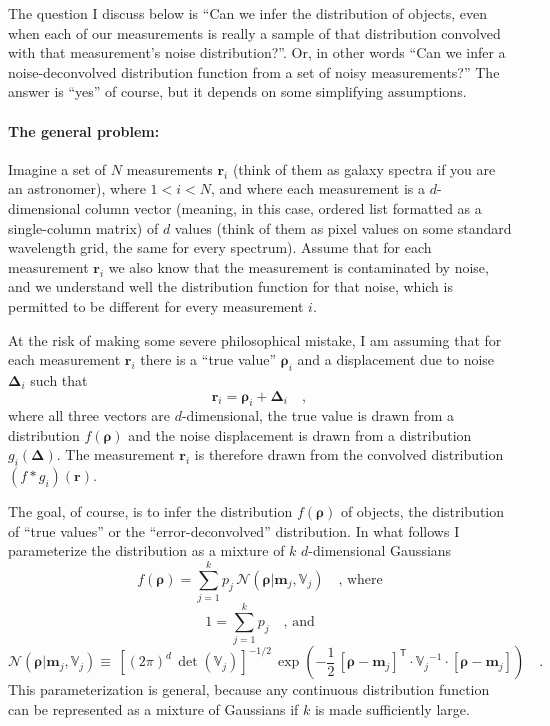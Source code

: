 \documentclass[12pt]{article}
\newcommand{\Mvector}[1]{\boldsymbol{#1}}
\newcommand{\measurement}{\Mvector{r}}
\newcommand{\truepoint}{\Mvector{\rho}}
\newcommand{\noise}{\Mvector{\Delta}}
\newcommand{\measurementi}{\measurement_i}
\newcommand{\truepointi}{\truepoint_i}
\newcommand{\noisei}{\noise_i}
\newcommand{\mean}{\Mvector{m}}
\newcommand{\meanj}{\mean_j}
\newcommand{\truedist}{f}
\newcommand{\noisedisti}{g_i}
\newcommand{\gaussian}{\mathcal{N}\!}
\newcommand{\ampj}{p_j}
\newcommand{\Mmatrix}[1]{\mathbb{#1}}
\newcommand{\varj}{\Mmatrix{V}_j}
\newcommand{\inverse}[1]{{#1}^{-1}}
\newcommand{\invvarj}{\inverse{\varj}}
\newcommand{\transpose}[1]{{#1}^{\mathsf{T}}}
\begin{document}
The question I discuss below is ``Can we infer the distribution of
objects, even when each of our measurements is really a sample of that
distribution convolved with that measurement's noise distribution?''.
Or, in other words ``Can we infer a noise-deconvolved distribution
function from a set of noisy measurements?''  The answer is ``yes'' of
course, but it depends on some simplifying assumptions.

\paragraph{The general problem:}
Imagine a set of $N$ measurements $\measurementi$ (think of them as
galaxy spectra if you are an astronomer), where $1<i<N$, and where
each measurement is a $d$-dimensional column vector (meaning, in this
case, ordered list formatted as a single-column matrix) of $d$ values
(think of them as pixel values on some standard wavelength grid, the
same for every spectrum).  Assume that for each measurement
$\measurementi$ we also know that the measurement is contaminated by
noise, and we understand well the distribution function for that
noise, which is permitted to be different for every measurement $i$.

At the risk of making some severe philosophical mistake, I am assuming
that for each measurement $\measurementi$ there is a ``true value''
$\truepointi$ and a displacement due to noise $\noisei$ such that
\begin{equation}
\measurementi=\truepointi+\noisei
\quad ,
\end{equation}
where all three vectors are $d$-dimensional, the true value is drawn
from a distribution $\truedist(\truepoint)$ and the noise displacement is
drawn from a distribution $\noisedisti(\noise)$.  The measurement
$\measurementi$ is therefore drawn from the convolved distribution
$(\truedist * \noisedisti)(\measurement)$.

The goal, of course, is to infer the distribution
$\truedist(\truepoint)$ of objects, the distribution of ``true
values'' or the ``error-deconvolved'' distribution.  In what follows I
parameterize the distribution as a mixture of $k$ $d$-dimensional
Gaussians
\begin{equation}
\truedist(\truepoint) =
  \sum_{j=1}^k\ampj\,\gaussian(\truepoint|\meanj,\varj)
\quad \mbox{, where}
\end{equation}
\begin{equation}
1 = \sum_{j=1}^k\ampj
\quad \mbox{, and}
\end{equation}
\begin{equation}
\gaussian(\truepoint|\meanj,\varj) \equiv
  \,\left[(2\pi)^d\,\det(\varj)\right]^{-1/2}
  \,\exp\left(-\frac{1}{2}\,\transpose{[\truepoint-\meanj]}
              \cdot\invvarj\cdot[\truepoint-\meanj]\right)
\quad .
\end{equation}
This parameterization is general, because any continuous distribution
function can be represented as a mixture of Gaussians if $k$ is made
sufficiently large.
\end{document}
